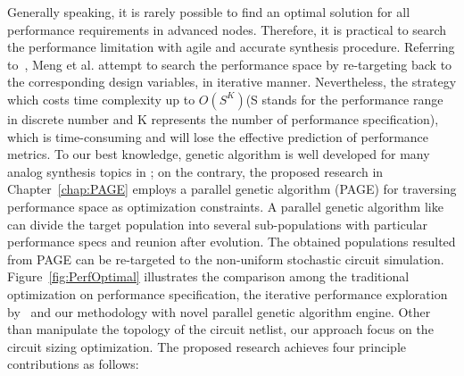       Generally speaking, it is rarely possible to find an optimal solution for all performance requirements in advanced nodes. Therefore, it is practical to search the performance limitation with agile and accurate synthesis procedure. Referring to~\cite{PerfMap_ISQED2011}, Meng et al. attempt to search the performance space by re-targeting back to the corresponding design variables, in iterative manner. Nevertheless, the strategy which costs time complexity up to $O(S^K)$(S stands for the performance range in discrete number and K represents the number of performance specification), which is time-consuming and will lose the effective prediction of performance metrics. To our best knowledge, genetic algorithm is well developed for many analog synthesis topics in \cite{DARWIN_DAC1995,CAFFEINE_DATE2005,HeteroSyn_DATE2006,NominalYieldArea_AHS2009}; on the contrary, the proposed research in Chapter~\ref{chap:PAGE} employs a parallel genetic algorithm (PAGE) for traversing performance space as optimization constraints. A parallel genetic algorithm like \cite{SurveyPGA1997,SurveyDistPGA1997} can divide the target population into several sub-populations with particular performance specs and reunion after evolution. The obtained populations resulted from PAGE can be re-targeted to the non-uniform stochastic circuit simulation. Figure~\ref{fig:PerfOptimal} illustrates the comparison among the traditional optimization on performance specification, the iterative performance exploration by~\cite{PerfMap_ISQED2011} and our methodology with novel parallel genetic algorithm engine. Other than manipulate the topology of the circuit netlist, our approach focus on the circuit sizing optimization. The proposed research achieves four principle contributions as follows: 
